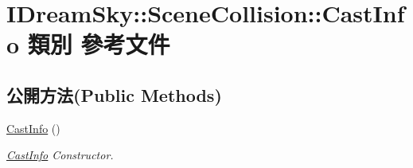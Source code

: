 \hypertarget{class_i_dream_sky_1_1_scene_collision_1_1_cast_info}{}\section{I\+Dream\+Sky\+:\+:Scene\+Collision\+:\+:Cast\+Info 類別 參考文件}
\label{class_i_dream_sky_1_1_scene_collision_1_1_cast_info}
\subsection*{公開方法(Public Methods)}
\begin{DoxyCompactItemize}
\item 
\hyperlink{class_i_dream_sky_1_1_scene_collision_1_1_cast_info_a9164895d637fdb9fbe7eeffcf373bcc1}{Cast\+Info} ()
\begin{DoxyCompactList}\small\item\em \hyperlink{class_i_dream_sky_1_1_scene_collision_1_1_cast_info}{Cast\+Info} Constructor. \end{DoxyCompactList}\end{DoxyCompactItemize}
